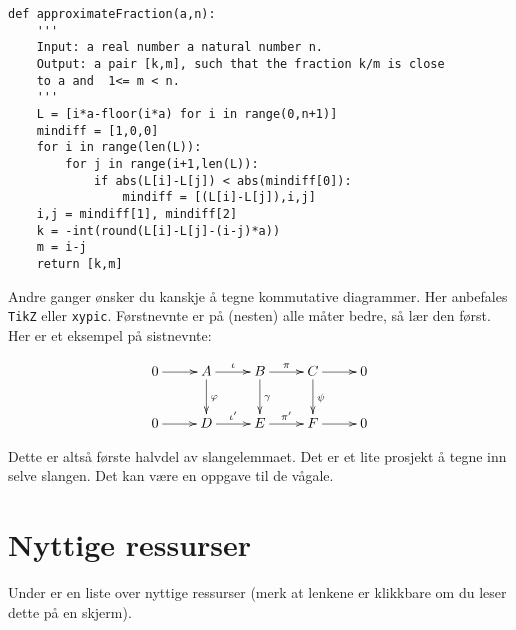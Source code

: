 \documentclass[a4paper, norsk]{article}  %
\begin{document}
\begin{center}
\begin{lstlisting}
def approximateFraction(a,n):
	'''
	Input: a real number a natural number n.
	Output: a pair [k,m], such that the fraction k/m is close 
	to a and  1<= m < n.
	'''
	L = [i*a-floor(i*a) for i in range(0,n+1)]
	mindiff = [1,0,0]
	for i in range(len(L)):
		for j in range(i+1,len(L)):
			if abs(L[i]-L[j]) < abs(mindiff[0]):
				mindiff = [(L[i]-L[j]),i,j]
	i,j = mindiff[1], mindiff[2]
	k = -int(round(L[i]-L[j]-(i-j)*a))
	m = i-j
	return [k,m]
\end{lstlisting}
\end{center}

Andre ganger ønsker du kanskje å tegne kommutative diagrammer. Her anbefales \texttt{TikZ} eller \texttt{xypic}. Førstnevnte er på (nesten) alle måter bedre, så lær den først. Her er et eksempel på sistnevnte:

\begin{equation}
\begin{gathered}
\xymatrix{
0 \ar[r] & A \ar[r]^\iota \ar[d]^\varphi & B \ar[r]^\pi \ar[d]^\gamma & C \ar[r]\ar[d]^\psi & 0 \\ 
0 \ar[r] & D \ar[r]^{\iota'} & E \ar[r]^{\pi'} & F \ar[r] & 0
}
\end{gathered}
\end{equation}

Dette er altså første halvdel av slangelemmaet. Det er et lite prosjekt å tegne inn selve slangen. Det kan være en oppgave til de vågale.


\section{Nyttige ressurser}
\label{seksjon:ressurser} 

Under er en liste over nyttige ressurser (merk at lenkene er klikkbare om du leser dette på en skjerm). 
\end{document}
